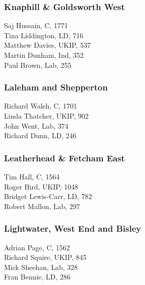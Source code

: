 \documentclass[a4paper,openany,10pt]{book}
\begin{document}
\subsubsection*{Knaphill \& Goldsworth West}



Saj Hussain, C, 1771\\
Tina Liddington, LD, 716\\
Matthew Davies, UKIP, 537\\
Martin Dunham, Ind, 352\\
Paul Brown, Lab, 255\\


\subsubsection*{Laleham and Shepperton}



Richard Walsh, C, 1701\\
Linda Thatcher, UKIP, 902\\
John Went, Lab, 374\\
Richard Dunn, LD, 246\\


\subsubsection*{Leatherhead \& Fetcham East}



Tim Hall, C, 1564\\
Roger Bird, UKIP, 1048\\
Bridget Lewis-Carr, LD, 782\\
Robert Mallon, Lab, 297\\


\subsubsection*{Lightwater, West End and Bisley}



Adrian Page, C, 1562\\
Richard Squire, UKIP, 845\\
Mick Sheehan, Lab, 328\\
Fran Bennie, LD, 286\\
\end{document}
